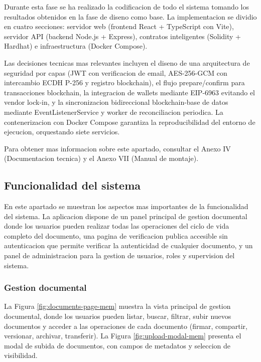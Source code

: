 \documentclass[11pt, a4paper]{article}
\begin{document}
Durante esta fase se ha realizado la codificacion de todo el sistema tomando los resultados obtenidos en la fase de diseno como base. La implementacion se dividio en cuatro secciones: servidor web (frontend React + TypeScript con Vite), servidor API (backend Node.js + Express), contratos inteligentes (Solidity + Hardhat) e infraestructura (Docker Compose).

Las decisiones tecnicas mas relevantes incluyen el diseno de una arquitectura de seguridad por capas (JWT con verificacion de email, AES-256-GCM con intercambio ECDH P-256 y registro blockchain), el flujo prepare/confirm para transacciones blockchain, la integracion de wallets mediante EIP-6963 evitando el vendor lock-in, y la sincronizacion bidireccional blockchain-base de datos mediante EventListenerService y worker de reconciliacion periodica. La contenerizacion con Docker Compose garantiza la reproducibilidad del entorno de ejecucion, orquestando siete servicios.

Para obtener mas informacion sobre este apartado, consultar el Anexo IV (Documentacion tecnica) y el Anexo VII (Manual de montaje).

\subsection{Funcionalidad del sistema}

En este apartado se muestran los aspectos mas importantes de la funcionalidad del sistema. La aplicacion dispone de un panel principal de gestion documental donde los usuarios pueden realizar todas las operaciones del ciclo de vida completo del documento, una pagina de verificacion publica accesible sin autenticacion que permite verificar la autenticidad de cualquier documento, y un panel de administracion para la gestion de usuarios, roles y supervision del sistema.

\subsubsection{Gestion documental}

La Figura \ref{fig:documents-page-mem} muestra la vista principal de gestion documental, donde los usuarios pueden listar, buscar, filtrar, subir nuevos documentos y acceder a las operaciones de cada documento (firmar, compartir, versionar, archivar, transferir). La Figura \ref{fig:upload-modal-mem} presenta el modal de subida de documentos, con campos de metadatos y seleccion de visibilidad.
\end{document}
